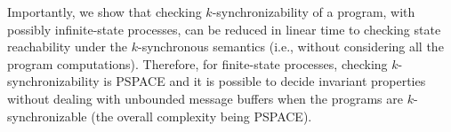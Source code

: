 
Importantly, we show that checking $k$-synchronizability of a program, with possibly infinite-state processes, can be reduced in linear time to checking state reachability under the $k$-synchronous semantics (i.e., without considering all the program computations). Therefore, for finite-state processes, checking $k$-synchronizability is PSPACE and 
it is possible to decide invariant properties without dealing with unbounded message buffers when the programs are $k$-synchronizable (the overall complexity being PSPACE).

